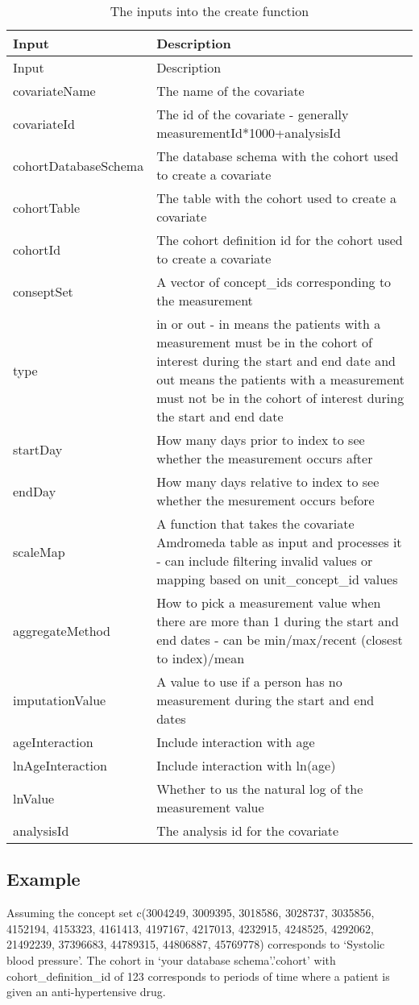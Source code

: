 \documentclass[
]{article}
\begin{document}
\begin{longtable}[]{@{}ll@{}}
\caption{The inputs into the create function}\tabularnewline
\toprule
Input & Description\tabularnewline
\midrule
\endfirsthead
\toprule
Input & Description\tabularnewline
\midrule
\endhead
covariateName & The name of the covariate\tabularnewline
covariateId & The id of the covariate - generally
measurementId*1000+analysisId\tabularnewline
cohortDatabaseSchema & The database schema with the cohort used to
create a covariate\tabularnewline
cohortTable & The table with the cohort used to create a
covariate\tabularnewline
cohortId & The cohort definition id for the cohort used to create a
covariate\tabularnewline
conseptSet & A vector of concept\_ids corresponding to the
measurement\tabularnewline
type & in or out - in means the patients with a measurement must be in
the cohort of interest during the start and end date and out means the
patients with a measurement must not be in the cohort of interest during
the start and end date\tabularnewline
startDay & How many days prior to index to see whether the measurement
occurs after\tabularnewline
endDay & How many days relative to index to see whether the mesurement
occurs before\tabularnewline
scaleMap & A function that takes the covariate Amdromeda table as input
and processes it - can include filtering invalid values or mapping based
on unit\_concept\_id values\tabularnewline
aggregateMethod & How to pick a measurement value when there are more
than 1 during the start and end dates - can be min/max/recent (closest
to index)/mean\tabularnewline
imputationValue & A value to use if a person has no measurement during
the start and end dates\tabularnewline
ageInteraction & Include interaction with age\tabularnewline
lnAgeInteraction & Include interaction with ln(age)\tabularnewline
lnValue & Whether to us the natural log of the measurement
value\tabularnewline
analysisId & The analysis id for the covariate\tabularnewline
\bottomrule
\end{longtable}

\hypertarget{example}{%
\subsection{Example}\label{example}}

Assuming the concept set c(3004249, 3009395, 3018586, 3028737, 3035856,
4152194, 4153323, 4161413, 4197167, 4217013, 4232915, 4248525, 4292062,
21492239, 37396683, 44789315, 44806887, 45769778) corresponds to
`Systolic blood pressure'. The cohort in `your database schema'.'cohort'
with cohort\_definition\_id of 123 corresponds to periods of time where
a patient is given an anti-hypertensive drug.
\end{document}
